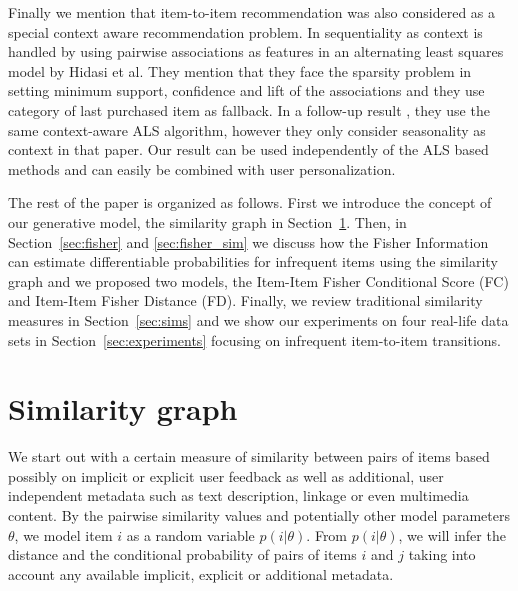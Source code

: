
Finally we mention that item-to-item recommendation was also considered as a special context aware recommendation problem.
In \cite{hidasi2012fast} sequentiality as context is handled by using pairwise associations as features in an alternating least squares model by Hidasi et al.
They mention that they face the sparsity problem in setting minimum support, confidence and lift of the associations and they use category of last purchased item as fallback.
In a follow-up result \cite{hidasi2013context}, they use the same context-aware ALS algorithm, however they only consider seasonality as context in that paper.
Our result can be used independently of the ALS based methods and can easily be combined with user personalization. 

The rest of the paper is organized as follows. First we introduce the concept of our generative model, the similarity graph in Section~\ref{sec:sim_graph}. Then, in Section~\ref{sec:fisher} and \ref{sec:fisher_sim} we discuss how the Fisher Information can estimate differentiable probabilities for infrequent items using the similarity graph and we proposed two models, the Item-Item Fisher Conditional Score (FC) and Item-Item Fisher Distance (FD). Finally, we review traditional similarity measures in Section~\ref{sec:sims} and we show our experiments on four real-life data sets in Section~\ref{sec:experiments} focusing on infrequent item-to-item transitions.

\section{Similarity graph}
\label{sec:sim_graph}

We start out with a certain measure of similarity between pairs of items based possibly on implicit or explicit user feedback as well as additional, user independent metadata such as text description, linkage or even multimedia content. 
By the pairwise similarity values and potentially other model parameters $\theta$, we model item $i$ as a random variable $p (i|\theta)$. 
From $p (i|\theta)$, we will infer the distance and the conditional probability of pairs of items $i$ and $j$ taking into account any available implicit, explicit or additional metadata.

